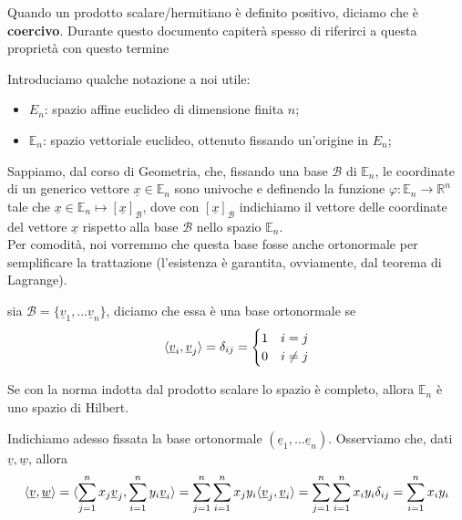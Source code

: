 	\begin{remark}
	Quando un prodotto scalare/hermitiano è definito positivo, diciamo che è \textbf{coercivo}. Durante questo documento capiterà spesso di riferirci a questa proprietà con questo termine
	\end{remark}
	\noindent Introduciamo qualche notazione a noi utile:
	\begin{itemize}
		\item $E_n$: spazio affine euclideo di dimensione finita $n$;
		\item $\mathbb{E}_n$: spazio vettoriale euclideo, ottenuto fissando un'origine in $E_n$;
	\end{itemize}
	Sappiamo, dal corso di Geometria, che, fissando una base $\mathcal{B}$ di $\mathbb{E}_n$, le coordinate di un generico vettore $\underline{x} \in \mathbb{E}_n$ sono univoche e definendo la funzione $\varphi: \mathbb{E}_n \to \mathbb{R}^n$ tale che $\underline{x} \in \mathbb{E}_n \mapsto [\underline{x}]_{\mathcal{B}}$, dove con $[\underline{x}]_{\mathcal{B}}$ indichiamo il vettore delle coordinate del vettore $\underline{x}$ rispetto alla base $\mathcal{B}$ nello spazio $\mathbb{E}_n$. \\
Per comodità, noi vorremmo che questa base fosse anche ortonormale per semplificare la trattazione (l'esistenza è garantita, ovviamente, dal teorema di Lagrange). 
\begin{definition}
	sia $\mathcal{B} = \{ \underline{v}_1, \ldots \underline{v}_n \}$, diciamo che essa è una base ortonormale se
	$$
	\langle \underline{v}_i, \underline{v}_j \rangle = \delta_{ij} = \begin{cases} 1 & i = j \\ 0 & i \neq j \end{cases}	
	$$
\end{definition}
\begin{remark}
	Se con la norma indotta dal prodotto scalare lo spazio è completo, allora $\mathbb{E}_n$ è uno spazio di Hilbert.
\end{remark}
\noindent Indichiamo adesso fissata la base ortonormale $(\underline{e}_1, \ldots \underline{e}_n)$. Osserviamo che, dati $\underline{v}, \underline{w}$, allora
$$
\langle \underline{v}, \underline{w} \rangle = \langle \sum_{j=1}^n x_j \underline{v}_j, \sum_{i=1}^n y_i \underline{v}_i \rangle = \sum_{j=1}^n \sum_{i=1}^n x_j y_i \langle \underline{v}_j, \underline{v}_i \rangle = \sum_{j=1}^n \sum_{i=1}^n x_i y_i \delta_{ij} = \sum_{i=1}^n x_i y_i
$$

